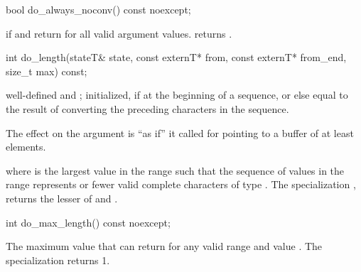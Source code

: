 %
%
\begin{itemdecl}
bool do_always_noconv() const noexcept;
\end{itemdecl}

\begin{itemdescr}
\pnum
\returns
{}
if
and
return
for all valid argument values.
returns
.
\end{itemdescr}

%
%
\begin{itemdecl}
int do_length(stateT& state, const externT* from, const externT* from_end,
              size_t max) const;
\end{itemdecl}

\begin{itemdescr}
\pnum
\preconditions
{}
well-defined and
;
 initialized, if at the beginning of a sequence, or else equal to
the result of converting the preceding characters in the sequence.

\pnum
\effects
The effect on the  argument is ``as if'' it called
for  pointing to a buffer of at least  elements.

\pnum
\returns
{}
where
is the largest value in the range
such that the sequence of values in the range
represents
or fewer valid complete characters of type
.
The specialization
,
returns the lesser of
and
.
\end{itemdescr}

%
%
\begin{itemdecl}
int do_max_length() const noexcept;
\end{itemdecl}

\begin{itemdescr}
\pnum
\returns
The maximum value that
can return for any valid range
\tcode{[from, from_end)}
and
value
.
The specialization
returns 1.
\end{itemdescr}

